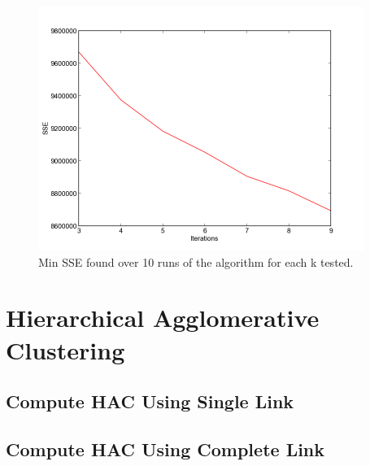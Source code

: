 \documentclass[letterpaper,10pt]{article}
\begin{document}
     \begin{figure}[ht]
    \centering
   \includegraphics[width=300pt]{diffks.png}
    \caption{Min SSE found over 10 runs of the algorithm for each k tested.}
    \label{fig:diffk}
    \end{figure}	


\section{Hierarchical Agglomerative Clustering}
\subsection{Compute HAC Using Single Link}
\subsection{Compute HAC Using Complete Link}
\end{document}
